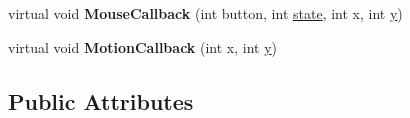 \begin{DoxyCompactItemize}
\item 
\hypertarget{class_bipartite_box_pruning_test_af8222959b9c56e65eb6f6fb45b7a12b5}{virtual void {\bfseries Mouse\+Callback} (int button, int \hyperlink{structstate}{state}, int x, int \hyperlink{_ice_utils_8h_aa7ffaed69623192258fb8679569ff9ba}{y})}\label{class_bipartite_box_pruning_test_af8222959b9c56e65eb6f6fb45b7a12b5}

\item 
\hypertarget{class_bipartite_box_pruning_test_a47ee324ffe8635a5e635471182870c7e}{virtual void {\bfseries Motion\+Callback} (int x, int \hyperlink{_ice_utils_8h_aa7ffaed69623192258fb8679569ff9ba}{y})}\label{class_bipartite_box_pruning_test_a47ee324ffe8635a5e635471182870c7e}

\end{DoxyCompactItemize}
\subsection*{Public Attributes}

